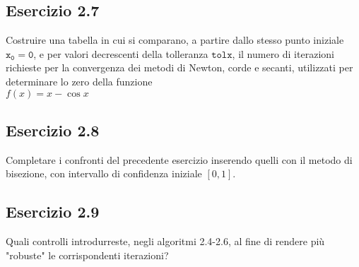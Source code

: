 \subsection{Esercizio 2.7}
Costruire una tabella in cui si comparano, a partire dallo stesso punto iniziale $\mathtt{x_{0} = 0}$, e per valori decrescenti della tolleranza $\mathtt{tolx}$, il numero di iterazioni richieste per la convergenza dei metodi di Newton, corde e secanti, utilizzati per determinare lo zero della funzione\\
\center $f(x) = x - \cos{x}$
\flushleft
\subsection{Esercizio 2.8}
Completare i confronti del precedente esercizio inserendo quelli con il metodo di bisezione, con intervallo di confidenza iniziale $ [0,1]$.
\subsection{Esercizio 2.9}
Quali controlli introdurreste, negli algoritmi 2.4-2.6, al fine di rendere più "robuste" le corrispondenti iterazioni?
